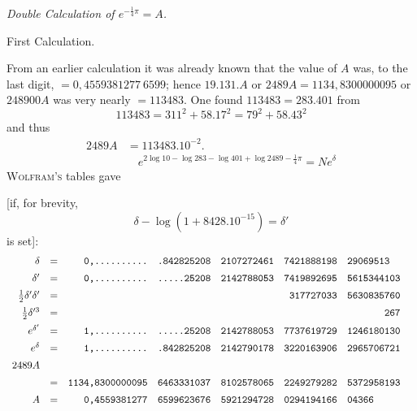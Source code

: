 \begingroup
\renewcommand{\arraystretch}{1.45}
\newcommand{\GaussIIITranscriptionDigits}[1]{\text{\ttfamily #1}}
\begin{center}\textit{Double Calculation of $e^{-\frac14\pi}=A$.}\end{center}
\begin{center}First Calculation.\end{center}

From an earlier calculation it was already known that the
value of $A$ was, to the last digit, $=0,4559381277\ 6599$; hence
$19.131.A$ or $2489A=1134,8300000095$ or $248900A$ was very nearly $=113483$.
One found $113483=283.401$ from
\[
113483=311^2+58.17^2=79^2+58.43^2
\]
and thus
\[
\begin{aligned}2489A&=113483.10^{-2}.\\[7pt]&\quad{}e^{2\log10-\log283-\log401+\log2489-\frac14\pi}=Ne^\delta\end{aligned}
\]
\textsc{Wolfram's} tables gave

[if, for brevity,
\[
\delta-\log(1+8428.10^{-15})=\delta'
\]
is set]:
\begingroup\footnotesize\setlength{\arraycolsep}{1pt}\renewcommand{\arraystretch}{1.12}\[
\begin{array}{rcrlllll}
\delta&=&\GaussIIITranscriptionDigits{0,..........}&\GaussIIITranscriptionDigits{.842825208}&\GaussIIITranscriptionDigits{2107272461}&\GaussIIITranscriptionDigits{7421888198}&\GaussIIITranscriptionDigits{29069513}&\\[5pt]
\delta'&=&\GaussIIITranscriptionDigits{0,..........}&\GaussIIITranscriptionDigits{.....25208}&\GaussIIITranscriptionDigits{2142788053}&\GaussIIITranscriptionDigits{7419892695}&\GaussIIITranscriptionDigits{5615344103}&\\[5pt]
\frac12\delta'\delta'&=&&&&\GaussIIITranscriptionDigits{\phantom{0}317727033}&\GaussIIITranscriptionDigits{5630835760}&\\[5pt]
\frac12\delta'^3&=&&&&&\GaussIIITranscriptionDigits{\phantom{0000000}267}&\\[5pt]
e^{\delta'}&=&\GaussIIITranscriptionDigits{1,..........}&\GaussIIITranscriptionDigits{.....25208}&\GaussIIITranscriptionDigits{2142788053}&\GaussIIITranscriptionDigits{7737619729}&\GaussIIITranscriptionDigits{1246180130}&\\[5pt]
e^\delta&=&\GaussIIITranscriptionDigits{1,..........}&\GaussIIITranscriptionDigits{.842825208}&\GaussIIITranscriptionDigits{2142790178}&\GaussIIITranscriptionDigits{3220163906}&\GaussIIITranscriptionDigits{2965706721}&\\[5pt]
2489A&&&&&&&\\[5pt]
&=&\GaussIIITranscriptionDigits{1134,8300000095}&\GaussIIITranscriptionDigits{6463331037}&\GaussIIITranscriptionDigits{8102578065}&\GaussIIITranscriptionDigits{2249279282}&\GaussIIITranscriptionDigits{5372958193}&\\[5pt]
A&=&\GaussIIITranscriptionDigits{0,4559381277}&\GaussIIITranscriptionDigits{6599623676}&\GaussIIITranscriptionDigits{5921294728}&\GaussIIITranscriptionDigits{0294194166}&\GaussIIITranscriptionDigits{04366}&
\end{array}
\]\endgroup

